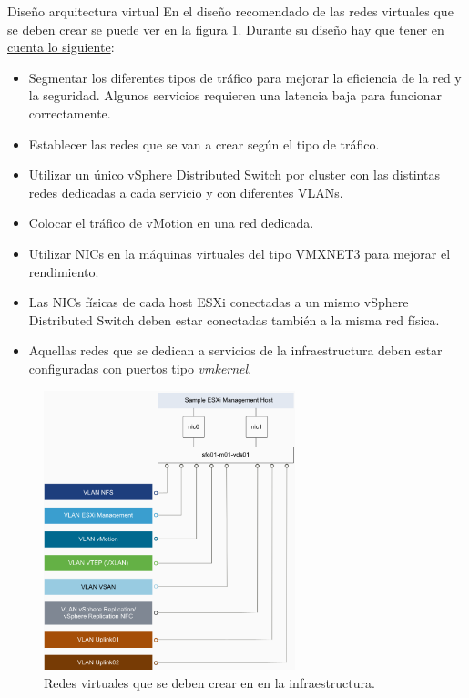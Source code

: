 \begin{subsection}{Diseño arquitectura virtual}
En el diseño recomendado de las redes virtuales que se deben crear se puede ver en la figura \ref{fig:redesVirtuales}. Durante su diseño \underline{hay que tener en cuenta lo siguiente}:
\begin{itemize}
    \item Segmentar los diferentes tipos de tráfico para mejorar la eficiencia de la red y la seguridad. Algunos servicios requieren una latencia baja para funcionar correctamente.
    \item Establecer las redes que se van a crear según el tipo de tráfico.
    \item Utilizar un único vSphere Distributed Switch por cluster con las distintas redes dedicadas a cada servicio y con diferentes VLANs.
    \item Colocar el tráfico de vMotion en una red dedicada.
    \item Utilizar NICs en la máquinas virtuales del tipo VMXNET3 para mejorar el rendimiento.
    \item Las NICs físicas de cada host ESXi conectadas a un mismo vSphere Distributed Switch deben estar conectadas también a la misma red física.
    \item Aquellas redes que se dedican a servicios de la infraestructura deben estar configuradas con puertos tipo \textit{vmkernel}.
\end{itemize}

\begin{figure}[h!]
  \centering
  \includegraphics[width=0.65\textwidth]{imaxes/conceptosPrevios/redesVDSCluster.png}
  \caption{Redes virtuales que se deben crear en en la infraestructura.}
  \label{fig:redesVirtuales}
\end{figure}
\FloatBarrier


\end{subsection}
